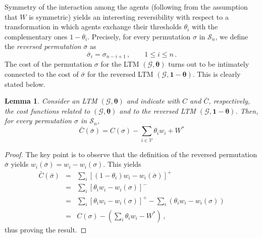 \documentclass[12pt,twoside,reqno]{amsart}
\newtheorem{lemma}[theorem]{Lemma}
\theoremstyle{definition}
\numberwithin{equation}{section}
\newcommand{\be}{\begin{equation}}
\newcommand{\ee}{\end{equation}}
\newcommand{\mc}{\mathcal}
\newcommand{\0}{\mathbf{0}}
\newcommand{\1}{\mathbf{1}}
\renewcommand{\S}{\mathcal{S} }
\newcommand{\R}{\mathbb{R}}
\newcommand{\thre}{\theta}
\newcommand{\threabs}{\theta}
\newcommand{\Thre}{\mathbf{\theta}}
\newcommand{\we}{W^*}
\begin{document}
{Symmetry of the interaction among the agents (following from the assumption that $W$ is symmetric) yields an interesting reversibility with respect to a transformation in which agents exchange their thresholds $\thre_i$ with the complementary ones $1-\thre_i$. 
%
%
%
Precisely, for every permutation $\sigma$ in $\mc S_{n}$, we define the \emph{reversed permutation} $\bar\sigma$ as
$$\bar\sigma_i= \sigma_{n-i+1}\,,\qquad 1\le i\le n\,.$$
The cost of the permutation $\sigma$ for the LTM $(\mc G, \Thre)$ turns out to be intimately connected to the cost of $\bar \sigma$ for the reversed LTM $(\mc G, \1-\Thre)$. This is clearly stated below.
\begin{lemma}\label{lemma:reversed} Consider an LTM $(\mc G, \Thre)$ and indicate with $C$ and $\bar C$, respectively, the cost functions related to $(\mc G, \Thre)$ and to the reversed LTM $(\mc G, \1-\Thre)$. Then, for every permutation
$\sigma$ in $\S_{n}$, 
\be\label{dualcost}\bar C({\bar \sigma})=C({\sigma})-\sum\limits_{i\in\mc V}\threabs_{i}w_i+\we
\ee
\end{lemma}
\begin{proof}
The key point is to observe that the definition of the reversed permutation $\bar\sigma$ yields $w_i(\bar\sigma)=w_i-w_i(\sigma)$. This yields
$$\begin{array}{rcl}\bar C({\bar\sigma})&=&\sum\nolimits_{i} [(1-\theta_i)w_i-w_i(\bar\sigma)]^+\\ [3pt]
&=&\sum\nolimits_{i} [\theta_iw_i-w_i(\sigma)]^-\\[3pt]
&=&\sum\nolimits_{i} [\theta_iw_i-w_i(\sigma)]^+- \sum\nolimits_{i} (\theta_iw_i-w_i(\sigma))\\[3pt]
&=&
C(\sigma)-(\sum\nolimits_{i}\threabs_{i}w_i-\we)\,,
\end{array}$$
thus proving the result.
\end{proof}

}
\end{document}
